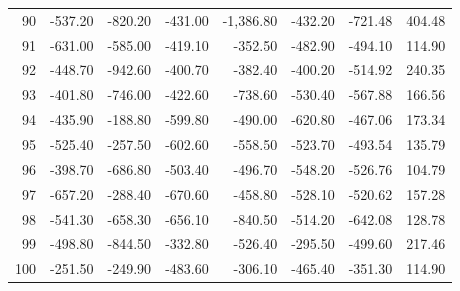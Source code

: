 \begin{longtable}{rrrrrrrr}
90 & -537.20 & -820.20 & -431.00 & -1,386.80 & -432.20 & -721.48 & 404.48  \\
91 & -631.00 & -585.00 & -419.10 & -352.50 & -482.90 & -494.10 & 114.90  \\
92 & -448.70 & -942.60 & -400.70 & -382.40 & -400.20 & -514.92 & 240.35  \\
93 & -401.80 & -746.00 & -422.60 & -738.60 & -530.40 & -567.88 & 166.56  \\
94 & -435.90 & -188.80 & -599.80 & -490.00 & -620.80 & -467.06 & 173.34  \\
95 & -525.40 & -257.50 & -602.60 & -558.50 & -523.70 & -493.54 & 135.79  \\
96 & -398.70 & -686.80 & -503.40 & -496.70 & -548.20 & -526.76 & 104.79  \\
97 & -657.20 & -288.40 & -670.60 & -458.80 & -528.10 & -520.62 & 157.28  \\
98 & -541.30 & -658.30 & -656.10 & -840.50 & -514.20 & -642.08 & 128.78  \\
99 & -498.80 & -844.50 & -332.80 & -526.40 & -295.50 & -499.60 & 217.46  \\
100 & -251.50 & -249.90 & -483.60 & -306.10 & -465.40 & -351.30 & 114.90  \\

\end{longtable}


